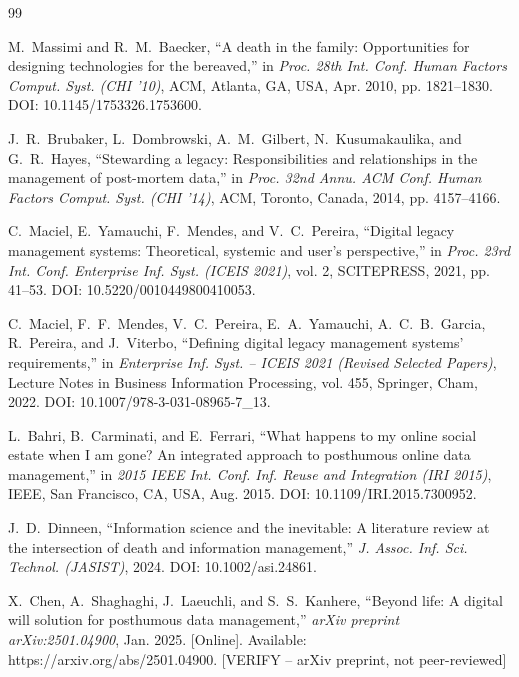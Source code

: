 \documentclass[12pt, a4paper]{article}
\begin{document}
\newpage

\begin{thebibliography}{99}

M.~Massimi and R.~M.~Baecker, ``A death in the family: Opportunities for designing technologies for the bereaved,'' in \textit{Proc. 28th Int. Conf. Human Factors Comput. Syst. (CHI '10)}, ACM, Atlanta, GA, USA, Apr. 2010, pp. 1821--1830. DOI: 10.1145/1753326.1753600.

J.~R.~Brubaker, L.~Dombrowski, A.~M.~Gilbert, N.~Kusumakaulika, and G.~R.~Hayes, ``Stewarding a legacy: Responsibilities and relationships in the management of post-mortem data,'' in \textit{Proc. 32nd Annu. ACM Conf. Human Factors Comput. Syst. (CHI '14)}, ACM, Toronto, Canada, 2014, pp. 4157--4166.

C.~Maciel, E.~Yamauchi, F.~Mendes, and V.~C.~Pereira, ``Digital legacy management systems: Theoretical, systemic and user's perspective,'' in \textit{Proc. 23rd Int. Conf. Enterprise Inf. Syst. (ICEIS 2021)}, vol. 2, SCITEPRESS, 2021, pp. 41--53. DOI: 10.5220/0010449800410053.

C.~Maciel, F.~F.~Mendes, V.~C.~Pereira, E.~A.~Yamauchi, A.~C.~B.~Garcia, R.~Pereira, and J.~Viterbo, ``Defining digital legacy management systems' requirements,'' in \textit{Enterprise Inf. Syst. -- ICEIS 2021 (Revised Selected Papers)}, Lecture Notes in Business Information Processing, vol. 455, Springer, Cham, 2022. DOI: 10.1007/978-3-031-08965-7\_13.

L.~Bahri, B.~Carminati, and E.~Ferrari, ``What happens to my online social estate when I am gone? An integrated approach to posthumous online data management,'' in \textit{2015 IEEE Int. Conf. Inf. Reuse and Integration (IRI 2015)}, IEEE, San Francisco, CA, USA, Aug. 2015. DOI: 10.1109/IRI.2015.7300952.

J.~D.~Dinneen, ``Information science and the inevitable: A literature review at the intersection of death and information management,'' \textit{J. Assoc. Inf. Sci. Technol. (JASIST)}, 2024. DOI: 10.1002/asi.24861.

X.~Chen, A.~Shaghaghi, J.~Laeuchli, and S.~S.~Kanhere, ``Beyond life: A digital will solution for posthumous data management,'' \textit{arXiv preprint arXiv:2501.04900}, Jan. 2025. [Online]. Available: https://arxiv.org/abs/2501.04900. [VERIFY -- arXiv preprint, not peer-reviewed]


\end{thebibliography}
\end{document}
